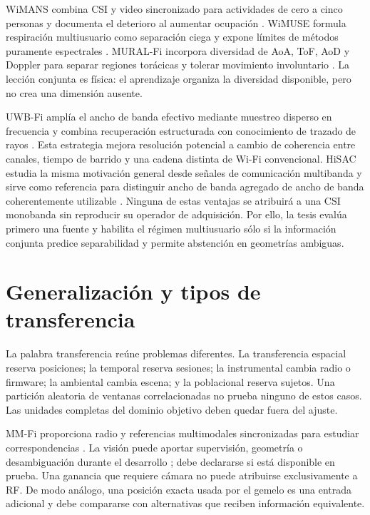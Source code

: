 WiMANS combina CSI y video sincronizado para actividades de cero a cinco personas
y documenta el deterioro al aumentar ocupación \citep{Huang2024WiMANS}. WiMUSE
formula respiración multiusuario como separación ciega y expone límites de métodos
puramente espectrales \citep{Yi2025WiMUSE}. MURAL-Fi incorpora diversidad de AoA,
ToF, AoD y Doppler para separar regiones torácicas y tolerar movimiento involuntario
\citep{Li2026MURALFI}. La lección conjunta es física: el aprendizaje organiza la
diversidad disponible, pero no crea una dimensión ausente.

UWB-Fi amplía el ancho de banda efectivo mediante muestreo disperso en frecuencia
y combina recuperación estructurada con conocimiento de trazado de rayos
\citep{Li2024UWBFI}. Esta estrategia mejora resolución potencial a cambio de
coherencia entre canales, tiempo de barrido y una cadena distinta de Wi-Fi
convencional. HiSAC estudia la misma motivación general desde señales de
comunicación multibanda y sirve como referencia para distinguir ancho de banda
agregado de ancho de banda coherentemente utilizable \citep{Pegoraro2024HiSAC}.
Ninguna de estas ventajas se atribuirá a una CSI monobanda sin reproducir su
operador de adquisición. Por ello, la tesis evalúa primero una fuente y habilita el régimen
multiusuario sólo si la información conjunta predice separabilidad y permite
abstención en geometrías ambiguas.

\section{Generalización y tipos de transferencia}

La palabra transferencia reúne problemas diferentes. La transferencia espacial
reserva posiciones; la temporal reserva sesiones; la instrumental cambia radio o
firmware; la ambiental cambia escena; y la poblacional reserva sujetos. Una
partición aleatoria de ventanas correlacionadas no prueba ninguno de estos casos.
Las unidades completas del dominio objetivo deben quedar fuera del ajuste.

MM-Fi proporciona radio y referencias multimodales sincronizadas para estudiar
correspondencias \citep{Yang2023MMFi}. La visión puede aportar supervisión,
geometría o desambiguación durante el desarrollo \citep{Hori2024Fusion}; debe
declararse si está disponible en prueba. Una ganancia que requiere cámara no puede
atribuirse exclusivamente a RF. De modo análogo, una posición exacta usada por el
gemelo es una entrada adicional y debe compararse con alternativas que reciben
información equivalente.


